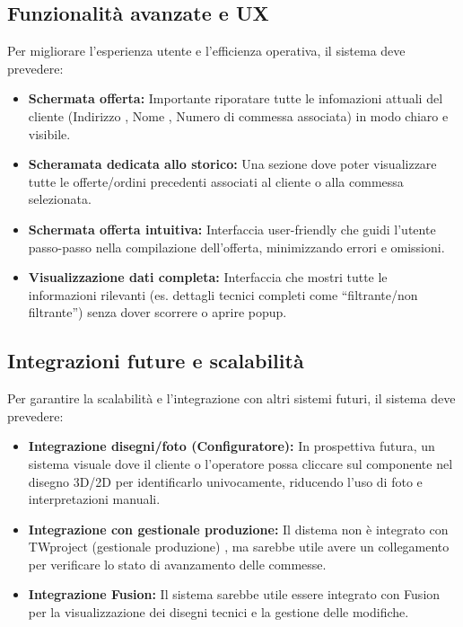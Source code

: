 \documentclass[12pt, a4paper]{article} %
\begin{document}
\subsection{Funzionalità avanzate e UX}
Per migliorare l'esperienza utente e l'efficienza operativa, il sistema deve prevedere:
\begin{itemize}
      \item \textbf{Schermata offerta:} Importante riporatare tutte le infomazioni attuali del cliente (Indirizzo , Nome , Numero di commessa associata) in modo chiaro e visibile.
      \item \textbf{Scheramata dedicata allo storico:} Una sezione dove poter visualizzare tutte le offerte/ordini precedenti associati al cliente o alla commessa selezionata.
      \item \textbf{Schermata offerta intuitiva:} Interfaccia user-friendly che guidi l'utente passo-passo nella compilazione dell'offerta, minimizzando errori e omissioni.
      \item \textbf{Visualizzazione dati completa:} Interfaccia che mostri tutte le informazioni rilevanti (es. dettagli tecnici completi come ``filtrante/non filtrante'') senza dover scorrere o aprire popup.
\end{itemize}

\subsection{Integrazioni future e scalabilità}
Per garantire la scalabilità e l'integrazione con altri sistemi futuri, il sistema deve prevedere:
\begin{itemize}
      \item \textbf{Integrazione disegni/foto (Configuratore):} In prospettiva futura, un sistema visuale dove il cliente o l'operatore possa cliccare sul componente nel disegno 3D/2D per identificarlo univocamente,
            riducendo l'uso di foto e interpretazioni manuali.
      \item \textbf{Integrazione con gestionale produzione:} Il distema non è integrato con TWproject (gestionale produzione) ,
            ma sarebbe utile avere un collegamento per verificare lo stato di avanzamento delle commesse.
      \item \textbf{Integrazione Fusion:} Il sistema sarebbe utile essere integrato con Fusion per la visualizzazione dei disegni tecnici e la gestione delle modifiche.
\end{itemize}
\end{document}
